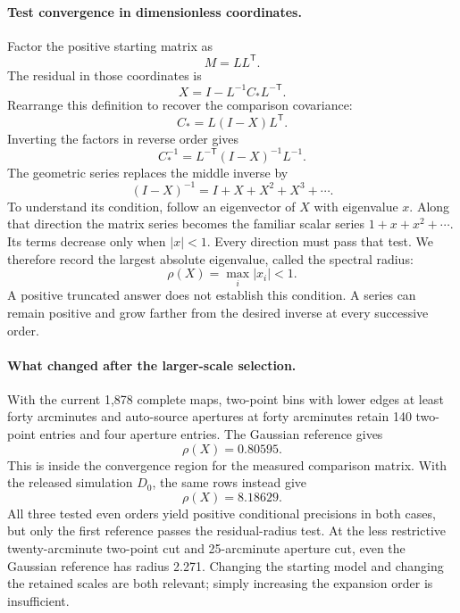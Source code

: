 \documentclass[11pt]{article}
\begin{document}
\paragraph{Test convergence in dimensionless coordinates.}
Factor the positive starting matrix as
\begin{equation}
 M=LL^{\mathsf T}.
\end{equation}
The residual in those coordinates is
\begin{equation}
 X=I-L^{-1}C_*L^{-\mathsf T}.
\end{equation}
Rearrange this definition to recover the comparison covariance:
\begin{equation}
 C_*=L(I-X)L^{\mathsf T}.
\end{equation}
Inverting the factors in reverse order gives
\begin{equation}
 C_*^{-1}=L^{-\mathsf T}(I-X)^{-1}L^{-1}.
\end{equation}
The geometric series replaces the middle inverse by
\begin{equation}
 (I-X)^{-1}=I+X+X^2+X^3+\cdots.
\end{equation}
To understand its condition, follow an eigenvector of $X$ with eigenvalue
$x$. Along that direction the matrix series becomes the familiar scalar
series $1+x+x^2+\cdots$. Its terms decrease only when $|x|<1$. Every
direction must pass that test. We therefore record the largest absolute
eigenvalue, called the spectral radius:
\begin{equation}
 \rho(X)=\max_i |x_i|<1.
\end{equation}
A positive truncated answer does not establish this condition. A series
can remain positive and grow farther from the desired inverse at every
successive order.

\paragraph{What changed after the larger-scale selection.}
With the current 1,878 complete maps, two-point bins with lower edges at
least forty arcminutes and auto-source apertures at forty arcminutes
retain 140 two-point entries and four aperture entries. The Gaussian
reference gives
\begin{equation}
 \rho(X)=0.80595.
\end{equation}
This is inside the convergence region for the measured comparison matrix.
With the released simulation $D_0$, the same rows instead give
\begin{equation}
 \rho(X)=8.18629.
\end{equation}
All three tested even orders yield positive conditional precisions in
both cases, but only the first reference passes the residual-radius test.
At the less restrictive twenty-arcminute two-point cut and
25-arcminute aperture cut, even the Gaussian reference has radius 2.271.
Changing the starting model and changing the retained scales are both
relevant; simply increasing the expansion order is insufficient.
\end{document}
